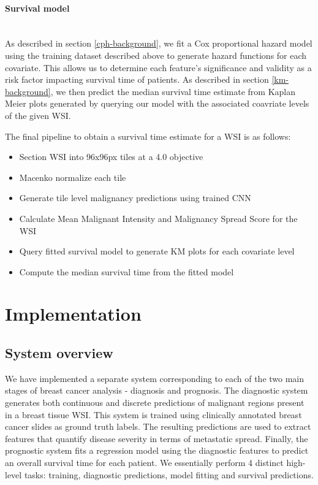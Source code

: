 \documentclass{l4proj}
\begin{document}
\subsubsection{Survival model}
\hfill\\
As described in section \ref{cph-background}, we fit a Cox proportional hazard model using the training dataset described above to generate hazard functions for each covariate. This allows us to determine each feature's significance and validity as a risk factor impacting survival time of patients. As described in section \ref{km-background}, we then predict the median survival time estimate from Kaplan Meier plots generated by querying our model with the associated coavriate levels of the given WSI. 

The final pipeline to obtain a survival time estimate for a WSI is as follows:
\begin{itemize}
    \item Section WSI into 96x96px tiles at a 4.0 objective
    \item Macenko normalize each tile
    \item Generate tile level malignancy predictions using trained CNN 
    \item Calculate Mean Malignant Intensity and Malignancy Spread Score for the WSI
    \item Query fitted survival model to generate KM plots for each covariate level  
    \item Compute the median survival time from the fitted model
\end{itemize}

\chapter{Implementation}
\section{System overview}
We have implemented a separate system corresponding to each of the two main stages of breast cancer analysis - diagnosis and prognosis. The diagnostic system generates both continuous and discrete predictions of malignant regions present in a breast tissue WSI. This system is trained using clinically annotated breast cancer slides as ground truth labels. The resulting predictions are used to extract features that quantify disease severity in terms of metastatic spread. Finally, the prognostic system fits a regression model using the diagnostic features to predict an overall survival time for each patient. We essentially perform 4 distinct high-level tasks: training, diagnostic predictions, model fitting and survival predictions. 
\end{document}
